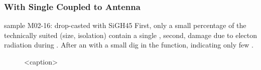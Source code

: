 		\subsubsection{\Nd With Single \siv Coupled to Antenna}
			sample M02-16: drop-casted with SiGH45
			First, only a small percentage of the technically suited \nds (size, isolation) contain a single \siv, second, damage due to electon radiation during \pp.
			After  an \siv with a small dig in the \gt function, indicating only few \sivs.

			\begin{figure}[tp]
				\begin{subfigure}[t]{ 0.49\linewidth}
					\centering
					\caption{}
					\label{subfig::single_siv_sat_before_transfer_antenna}
				\end{subfigure}
				\hfill
				\begin{subfigure}[t]{ 0.49\linewidth}
					\centering
					\caption{}
					\label{subfig::single_siv_g2_before_transfer_antenna}
				\end{subfigure}
				\caption{<caption>}
			\end{figure}

